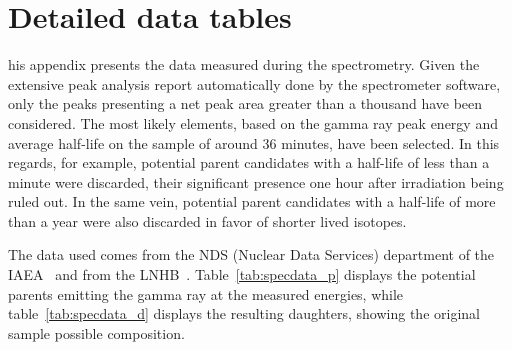 \chapter{Detailed data tables}
\label{app:app02}

his appendix presents the data measured during the spectrometry. Given the extensive peak analysis report automatically done by the spectrometer software, only the peaks presenting a net peak area greater than a thousand have been considered. The most likely elements, based on the gamma ray peak energy and average half-life on the sample of around 36 minutes, have been selected. In this regards, for example, potential parent candidates with a half-life of less than a minute were discarded, their significant presence one hour after irradiation being ruled out. In the same vein, potential parent candidates with a half-life of more than a year were also discarded in favor of shorter lived isotopes.

The data used comes from the NDS (Nuclear Data Services) department of the IAEA~\cite{iaea_nds} and from the LNHB~\cite{lnhb01}. Table~\ref{tab:specdata_p} displays the potential parents emitting the gamma ray at the measured energies, while table~\ref{tab:specdata_d} displays the resulting daughters, showing the original sample possible composition.

